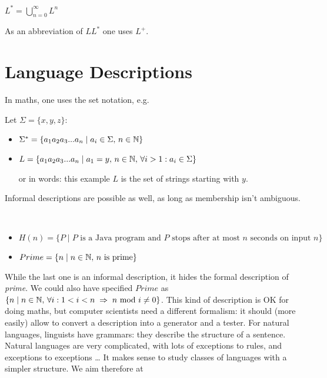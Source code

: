 \begin{definition}
$L^* = \bigcup_{n=0}^\infty L^n$
\end{definition}
As an abbreviation of $LL^*$ one uses $L^+$.

\section{Language Descriptions}

In maths, one uses the set notation, e.g.

\begin{example}
Let $\Sigma = \{x,y,z\}$:
\begin{itemize}
	\item $\Sigma^* = \{a_1a_2a_3...a_n\mid a_i \in \Sigma,\, n \in \mathbb{N} \}$
	\item $L = \{a_1a_2a_3...a_n\mid a_1 = y,\, n \in \mathbb{N},\, \forall i > 1: a_i \in \Sigma\}$
	
	or in words: this example $L$ is the set of strings starting with $y$.
\end{itemize}
\end{example}

Informal descriptions are possible as well, as long as membership isn't ambiguous.

\begin{example}
~~
\begin{itemize}
	\item $H(n) = \{P \mid \text{$P$ is a Java program and $P$ stops after at most $n$ seconds on input $n$}\}$
	\item $Prime = \{n\mid n \in \mathbb{N},\, \text{$n$ is prime}\}$
\end{itemize}
\end{example}

While the last one is an informal description, it hides the formal
description of {\em prime}. We could also have specified $Prime$ as $\{n\mid n \in \mathbb{N},\, \forall i : 1 < i < n \;\Rightarrow\; n\!\!\mod i \neq 0\}$. 
This kind of description is OK for doing maths, but computer
scientists need a different formalism: it should (more easily) allow
to convert a description into a generator and a tester. For natural
languages, linguists have grammars: they describe the structure of a
sentence. Natural languages are very complicated, with lots of
exceptions to rules, and exceptions to exceptions \ldots{} It makes sense
to study classes of languages with a simpler structure. We aim
therefore at

